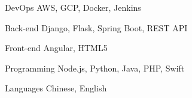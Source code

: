 

\begin{cvskills}

  \cvskill
    {DevOps} %
    {AWS, GCP, Docker, Jenkins} %

  \cvskill
    {Back-end} %
    {Django, Flask, Spring Boot, REST API} %

  \cvskill
    {Front-end} %
    {Angular, HTML5} %

  \cvskill
    {Programming} %
    {Node.js, Python, Java, PHP, Swift} %

  \cvskill
    {Languages} %
    {Chinese, English} %

\end{cvskills}
